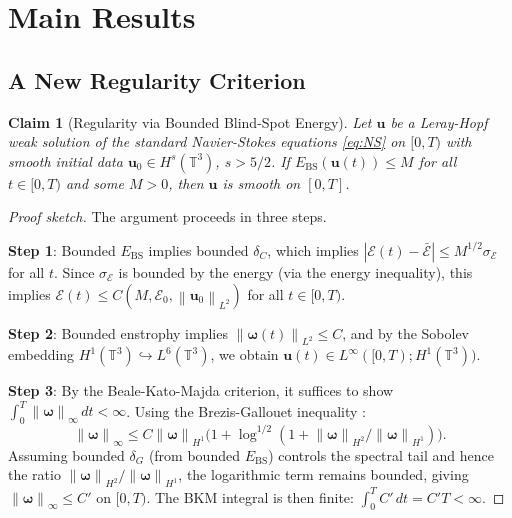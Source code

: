 \documentclass[12pt, a4paper]{article}
\newtheorem{theorem}{Claim}[section]
\newcommand{\T}{\mathbb{T}}
\newcommand{\norm}[1]{\left\| #1 \right\|}
\newcommand{\Ebs}{E_{\mathrm{BS}}}
\begin{document}
\section{Main Results}\label{sec:results}

\subsection{A New Regularity Criterion}

\begin{theorem}[Regularity via Bounded Blind-Spot Energy]\label{thm:criterion}
Let $\mathbf{u}$ be a Leray-Hopf weak solution of the standard
Navier-Stokes equations \eqref{eq:NS} on $[0,T)$ with smooth initial
data $\mathbf{u}_0 \in H^s(\T^3)$, $s > 5/2$.
If $\Ebs(\mathbf{u}(t)) \leq M$ for all $t \in [0,T)$ and some $M > 0$,
then $\mathbf{u}$ is smooth on $[0,T]$.
\end{theorem}

\begin{proof}[Proof sketch]
The argument proceeds in three steps.

\textbf{Step 1}: Bounded $\Ebs$ implies bounded $\delta_C$,
which implies
$|\mathcal{E}(t) - \bar{\mathcal{E}}| \leq M^{1/2} \sigma_{\mathcal{E}}$
for all $t$. Since $\sigma_{\mathcal{E}}$ is bounded by the energy
(via the energy inequality), this implies
$\mathcal{E}(t) \leq C(M, \mathcal{E}_0, \norm{\mathbf{u}_0}_{L^2})$
for all $t \in [0,T)$.

\textbf{Step 2}: Bounded enstrophy implies
$\norm{\boldsymbol{\omega}(t)}_{L^2} \leq C$, and by the
Sobolev embedding $H^1(\T^3) \hookrightarrow L^6(\T^3)$,
we obtain $\mathbf{u}(t) \in L^\infty([0,T); H^1(\T^3))$.

\textbf{Step 3}: By the Beale-Kato-Majda criterion, it suffices
to show $\int_0^T \norm{\boldsymbol{\omega}}_\infty \, dt < \infty$.
Using the Brezis-Gallouet inequality \cite{bg1980}:
\[
\norm{\boldsymbol{\omega}}_\infty \leq C \norm{\boldsymbol{\omega}}_{H^1}
\bigl(1 + \log^{1/2}(1 + \norm{\boldsymbol{\omega}}_{H^2}/\norm{\boldsymbol{\omega}}_{H^1})\bigr).
\]
Assuming bounded $\delta_G$ (from bounded $\Ebs$) controls the spectral
tail and hence the ratio $\norm{\boldsymbol{\omega}}_{H^2}/\norm{\boldsymbol{\omega}}_{H^1}$,
the logarithmic term remains bounded, giving
$\norm{\boldsymbol{\omega}}_\infty \leq C'$ on $[0,T)$.
The BKM integral is then finite: $\int_0^T C' \, dt = C'T < \infty$.
\end{proof}
\end{document}
